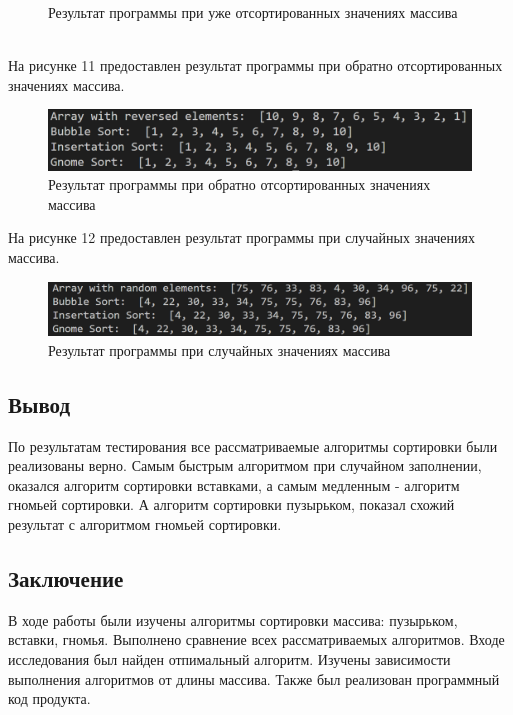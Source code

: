 \documentclass[a4paper, 12pt]{article}
\begin{document}
\begin{flushleft}
\begin{figure}[h]
		\centering\caption{Результат программы при уже отсортированных значениях массива}
	\end{figure}
	\\ \hspace*{5mm} На рисунке 11 предоставлен результат программы при обратно отсортированных значениях массива.
	\begin{figure}[h!]
		\centering \includegraphics[scale=1.2]{reversed_test}
		\centering\caption{Результат программы при обратно отсортированных значениях массива}
	\end{figure}
	\clearpage
	\newpage
	\hspace*{5mm} На рисунке 12 предоставлен результат программы при случайных значениях массива.
	\begin{figure}[h!]
		\centering \includegraphics[scale=1.2]{random_test}
		\centering\caption{Результат программы при случайных значениях массива}
	\end{figure}
	\subsection{Вывод}
	\hspace*{5mm} По результатам тестирования все рассматриваемые алгоритмы сортировки были реализованы верно. Самым быстрым алгоритмом при случайном заполнении, оказался алгоритм сортировки вставками, а самым медленным - алгоритм гномьей сортировки. А алгоритм сортировки пузырьком, показал схожий результат с алгоритмом гномьей сортировки.
\end{flushleft}

\begin{flushleft}
	\newpage
	\section*{Заключение}
	\hspace*{5mm} В ходе работы были изучены алгоритмы сортировки массива: пузырьком, вставки, гномья. Выполнено сравнение всех рассматриваемых алгоритмов. Входе исследования был найден отпимальный алгоритм. Изучены зависимости выполнения алгоритмов от длины массива. Также был реализован программный код продукта.
	
\end{flushleft}

\clearpage
\newpage

\printbibliography
\end{document}
